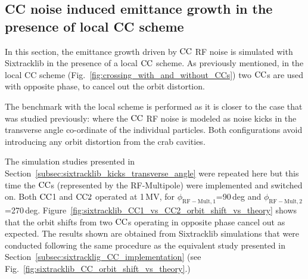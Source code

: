 \subsection{CC noise induced emittance growth in the presence of local CC scheme}\label{subsec:local_CC_sixtracklib}


In this section, the emittance growth driven by ${\mathrm{CC}}$ RF noise is simulated with Sixtracklib in the presence of a local ${\mathrm{CC}}$ scheme. As previously mentioned, in the local CC scheme (Fig.~\ref{fig:crossing_with_and_without_CCs}) two ${\mathrm{CC}}$s are used with opposite phase, to cancel out the orbit distortion.


The benchmark with the local scheme is performed as it is closer to the case that was studied previously: where the ${\mathrm{CC}}$ RF noise is modeled as noise kicks in the transverse angle co-ordinate of the individual particles. Both configurations avoid introducing any orbit distortion from the crab cavities.

The simulation studies presented in Section~\ref{subsec:sixtracklib_kicks_transverse_angle} were repeated here but this time the ${\mathrm{CC}}$s (represented by the RF-Multipole) were implemented and switched on. Both ${\mathrm{CC}}$1 and ${\mathrm{CC}}2$ operated at 1\,MV, for $\phi_\mathrm{RF-Mult, 1}$=90\,deg and  $\phi_\mathrm{RF-Mult, 2}$=270\,deg. Figure~\ref{fig:sixtracklib_CC1_vs_CC2_orbit_shift_vs_theory} shows that the orbit shifts from two ${\mathrm{CC}}$s operating in opposite phase cancel out as expected. The results shown are obtained from Sixtracklib simulations that were conducted following the same procedure as the equivalent study presented in Section~\ref{subsec:sixtracklig_CC_implementation} (see Fig.~\ref{fig:sixtracklib_CC_orbit_shift_vs_theory}.)

